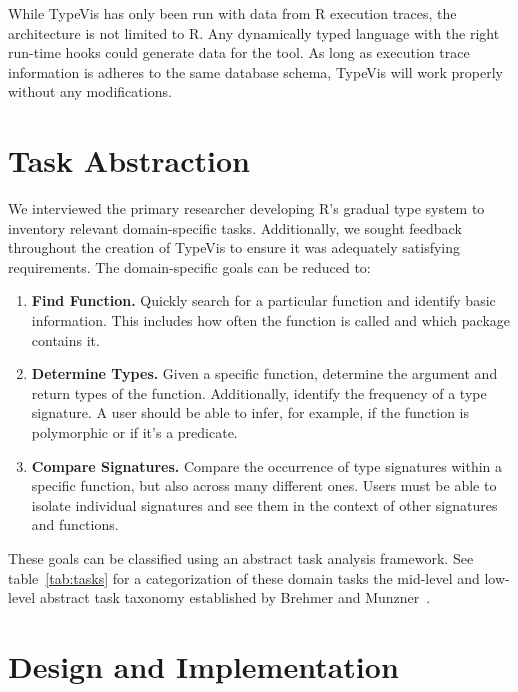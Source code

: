 \documentclass{vgtc}                          %
\begin{document}
While {\sc TypeVis} has only been run with
data from R execution traces, the architecture is not
limited to R.
Any dynamically typed language with the right run-time
hooks could generate data for the tool.
As long as execution trace information is adheres to
the same database schema, {\sc TypeVis} will
work properly without any modifications.


\section{Task Abstraction}

We interviewed the primary researcher developing R's gradual type system
to inventory relevant domain-specific tasks.
Additionally, we sought feedback throughout the creation of {\sc TypeVis}
to ensure it was adequately satisfying requirements.
The domain-specific goals can be reduced to:

\begin{enumerate}
\item {\bf Find Function.} Quickly search for a particular function and identify basic information. This includes how often the function is called and which package contains it.
\item {\bf Determine Types.} Given a specific function, determine the argument and return types of the function. Additionally, identify the frequency of a type signature. A user should be able to infer, for example, if the function is polymorphic or if it's a predicate.
\item {\bf Compare Signatures.} Compare the occurrence of type signatures within a specific function, but also across many different ones. Users must be able to isolate individual signatures and see them in the context of other signatures and functions.
\end{enumerate}

These goals can be classified using an abstract task analysis framework.
See table~\ref{tab:tasks} for a categorization of these domain tasks
the mid-level and low-level abstract task taxonomy
established by Brehmer and Munzner~\cite{brehmer:2013}.


\section{Design and Implementation}
\end{document}

